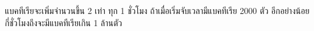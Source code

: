 ﻿%
\question แบคทีเรียจะเพิ่มจำนวนขึ้น 2 เท่า ทุก 1 ชั่วโมง ถ้าเมื่อเริ่มจับเวลามีแบคทีเรีย 2000 ตัว อีกอย่างน้อยกี่ชั่วโมงถึงจะมีแบคทีเรียเกิน 1 ล้านตัว
\newline
{}
